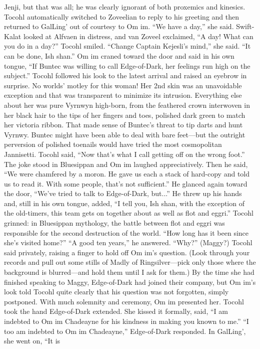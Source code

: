\documentclass[9pt]{article}
\begin{document}
Jenji, but that was all; he was clearly ignorant of both proxemics and kinesics. Tocohl automatically
switched to Zoveelian to reply to his greeting and then returned to GalLing’ out of courtesy to Om im.
“We have a day,” she said.
Swift-Kalat looked at Alfvaen in distress, and van Zoveel exclaimed, “A day! What can you do in a
day?”
Tocohl smiled. “Change Captain Kejesli’s mind,” she said.
“It can be done, Ish shan.” Om im craned toward the door and said in his own tongue, “If Buntec
was willing to call Edge-of-Dark, her feelings run high on the subject.”
Tocohl followed his look to the latest arrival and raised an eyebrow in surprise. No worlds’ motley
for this woman! Her 2nd skin was an unavoidable exception and that was transparent to minimize its
intrusion. Everything else about her was pure Vyrnwyn high-born, from the feathered crown interwoven
in her black hair to the tips of her fingers and toes, polished dark green to match her victoria ribbon.
That made sense of Buntec’s threat to tip darts and hunt Vyrnwy. Buntec might have been able to
deal with bare feet—but the outright perversion of polished toenails would have tried the most
cosmopolitan Jannisetti.
Tocohl said, “Now that’s what I call getting off on the wrong foot.”
The joke stood in Bluesippan and Om im laughed appreciatively. Then he said, “We were chamfered
by a moron. He gave us each a stack of hard-copy and told us to read it. With some people, that’s not
sufficient.”
He glanced again toward the door, “We’ve tried to talk to Edge-of-Dark, but...” He threw up his
hands and, still in his own tongue, added, “I tell you, Ish shan, with the exception of the old-timers, this
team gets on together about as well as flot and eggri.”
Tocohl grinned: in Bluesippan mythology, the battle between flot and eggri was responsible for the
second destruction of the world. “How long has it been since she’s visited home?”
“A good ten years,” he answered. “Why?”
(Maggy?) Tocohl said privately, raising a finger to hold off Om im’s question. (Look through your
records and pull out some stills of Madly of Ringsilver—pick only those where the background is
blurred—and hold them until I ask for them.)
By the time she had finished speaking to Maggy, Edge-of-Dark had joined their company, but Om
im’s look told Tocohl quite clearly that his question was not forgotten, simply postponed.
With much solemnity and ceremony, Om im presented her. Tocohl took the hand Edge-of-Dark
extended. She kissed it formally, said, “I am indebted to Om im Chadeayne for his kindness in making
you known to me.”
“I too am indebted to Om im Chadeayne,” Edge-of-Dark responded. In GalLing’, she went on, “It is
\end{document}
